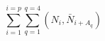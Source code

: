 \begin{equation}
\sum_{i=1}^{i=p} \sum_{q=1}^{q=4}
(N_i, \bar{N}_{i + A_q})
\label{fermions}
\end{equation}

